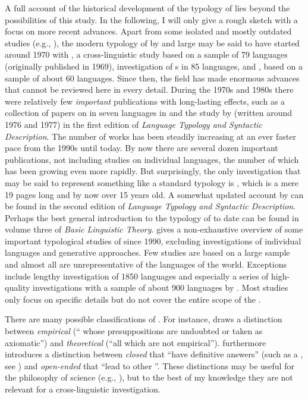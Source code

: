 A full account of the historical development of the typology of  lies beyond the possibilities of this study. In the following, I will only give a rough sketch with a focus on more recent advances. Apart from some isolated and mostly outdated studies (e.g., \citealt{Bolinger1957}), the modern typology of  by and large may be said to have started around 1970 with \citet{Ultan1978}, a cross-linguistic study based on a sample of 79 languages (originally published in 1969),  investigation of s in 85 languages, and \citet{Danielsen1972}, based on a sample of about 60 languages. Since then, the field has made enormous advances that cannot be reviewed here in every detail. During the 1970s and 1980s there were relatively few \textit{important} publications with long-lasting effects, such as a collection of papers on  in seven languages in \citet{Chisholm1984} and the study by \citet{SadockZwicky1985} (written around 1976 and 1977) in the first edition of \textit{Language Typology and Syntactic Description}. The number of works has been steadily increasing at an ever faster pace from the 1990s until today. By now there are several dozen important publications, not including studies on individual languages, the number of which has been growing even more rapidly. But surprisingly, the only investigation that may be said to represent something like a standard typology is \citet{Siemund2001}, which is a mere 19 pages long and by now over 15 years old. A somewhat updated account by \citet{KönigSiemund2007} can be found in the second edition of \textit{Language Typology and Syntactic Description}. Perhaps the best general introduction to the typology of  to date can be found in volume three of  \textit{Basic Linguistic Theory}.  gives a non-exhaustive overview of some important typological studies of  since 1990, excluding investigations of individual languages and generative approaches. Few studies are based on a large sample and almost all are unrepresentative of the languages of the world. Exceptions include  lengthy investigation of 1850 languages and especially a series of high-quality investigations with a sample of about 900 languages by \cite{Dryer2013k,Dryer2013l,Dryer2013m}. Most studies only focus on specific details but do not cover the entire scope of the .

There are many possible classifications of . For instance, \citet[439]{Sanitt2007} draws a distinction between \textit{empirical} (“ whose presuppositions are undoubted or taken as axiomatic”) and \textit{theoretical}  (“all  which are not empirical”). \citet[559]{Sanitt2011} furthermore introduces a distinction between \textit{closed}  that “have definitive answers” (such as a , see ) and \textit{open-ended}  that “lead to other ”. These distinctions may be useful for the philosophy of science (e.g., \citealt{Meyer1980}), but to the best of my knowledge they are not relevant for a cross-linguistic investigation.

